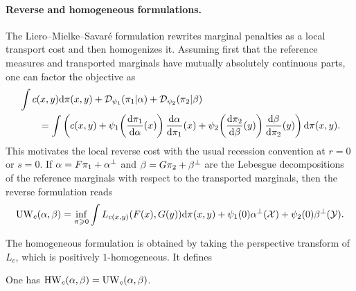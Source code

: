 \paragraph{Reverse and homogeneous formulations.}

The Liero--Mielke--Savar\'e formulation rewrites marginal penalties as a local transport cost and then homogenizes it. Assuming first that the reference measures and transported marginals have mutually absolutely continuous parts, one can factor the objective as
\begin{align*}
&\int c(x,y)\mathrm{d}\pi(x,y)
+\mathcal{D}_{\psi_1}(\pi_1|\alpha)+\mathcal{D}_{\psi_2}(\pi_2|\beta) \\
&\qquad =
\int
\left(
	c(x,y)
	+
	\psi_1\!\left(\frac{\mathrm{d}\pi_1}{\mathrm{d}\alpha}(x)\right)\frac{\mathrm{d}\alpha}{\mathrm{d}\pi_1}(x)
	+
	\psi_2\!\left(\frac{\mathrm{d}\pi_2}{\mathrm{d}\beta}(y)\right)\frac{\mathrm{d}\beta}{\mathrm{d}\pi_2}(y)
\right)
\mathrm{d}\pi(x,y).
\end{align*}
This motivates the local reverse cost
with the usual recession convention at $r=0$ or $s=0$. If $\alpha=F\pi_1+\alpha^\perp$ and $\beta=G\pi_2+\beta^\perp$ are the Lebesgue decompositions of the reference marginals with respect to the transported marginals, then the reverse formulation reads
\[
	\operatorname{UW}_c(\alpha,\beta)
	=
	\inf_{\pi\geqslant0}
	\int L_{c(x,y)}(F(x),G(y))\mathrm{d}\pi(x,y)
	+
	\psi_1(0)\alpha^\perp(\mathcal{X})
	+
	\psi_2(0)\beta^\perp(\mathcal{Y}).
\]

The homogeneous formulation is obtained by taking the perspective transform of $L_c$,
which is positively $1$-homogeneous. It defines

\begin{prop}\label{prop-homogeneous-unbalanced}
	One has $\operatorname{HW}_c(\alpha,\beta)=\operatorname{UW}_c(\alpha,\beta)$.
\end{prop}

